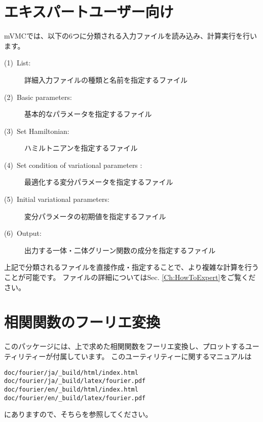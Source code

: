 \section{エキスパートユーザー向け}
mVMCでは、以下の6つに分類される入力ファイルを読み込み、計算実行を行います。
\begin{description}
\item[(1)~List:]詳細入力ファイルの種類と名前を指定するファイル
\item[(2)~Basic parameters:]基本的なパラメータを指定するファイル
\item[(3)~Set Hamiltonian:]ハミルトニアンを指定するファイル 
\item[(4)~Set condition of variational parameters :] 最適化する変分パラメータを指定するファイル
\item[(5)~Initial variational parameters:]変分パラメータの初期値を指定するファイル
\item[(6)~Output:]出力する一体・二体グリーン関数の成分を指定するファイル
\end{description}

上記で分類されるファイルを直接作成・指定することで、より複雑な計算を行うことが可能です。
ファイルの詳細についてはSec. \ref{Ch:HowToExpert}をご覧ください。

\section{相関関数のフーリエ変換}

このパッケージには、上で求めた相関関数をフーリエ変換し、プロットするユーティリティーが付属しています。
このユーティリティーに関するマニュアルは
\begin{verbatim}
doc/fourier/ja/_build/html/index.html
doc/fourier/ja/_build/latex/fourier.pdf
doc/fourier/en/_build/html/index.html
doc/fourier/en/_build/latex/fourier.pdf
\end{verbatim}
にありますので、そちらを参照してください。
